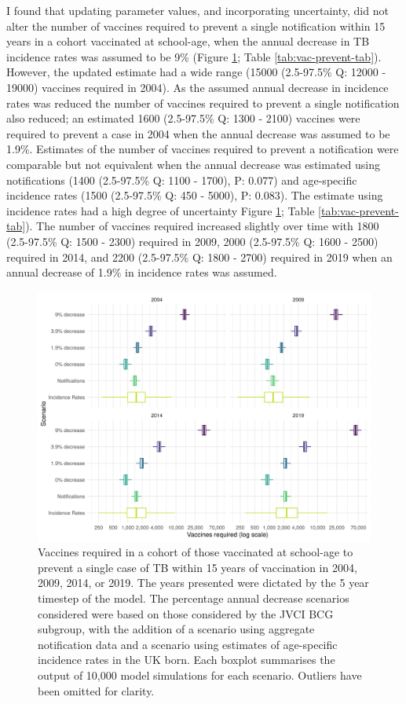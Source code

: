 \documentclass[11pt,twoside]{bristolthesis}
\begin{document}
  I found that updating parameter values, and incorporating uncertainty, did not alter the number of vaccines required to prevent a single notification within 15 years in a cohort vaccinated at school-age, when the annual decrease in TB incidence rates was assumed to be 9\% (Figure \ref{fig:graph-vacs-to-prev}; Table \ref{tab:vac-prevent-tab}). However, the updated estimate had a wide range (15000 (2.5-97.5\% Q: 12000 - 19000) vaccines required in 2004). As the assumed annual decrease in incidence rates was reduced the number of vaccines required to prevent a single notification also reduced; an estimated 1600 (2.5-97.5\% Q: 1300 - 2100) vaccines were required to prevent a case in 2004 when the annual decrease was assumed to be 1.9\%. Estimates of the number of vaccines required to prevent a notification were comparable but not equivalent when the annual decrease was estimated using notifications (1400 (2.5-97.5\% Q: 1100 - 1700), P: 0.077) and age-specific incidence rates (1500 (2.5-97.5\% Q: 450 - 5000), P: 0.083). The estimate using incidence rates had a high degree of uncertainty Figure \ref{fig:graph-vacs-to-prev}; Table \ref{tab:vac-prevent-tab}). The number of vaccines required increased slightly over time with 1800 (2.5-97.5\% Q: 1500 - 2300) required in 2009, 2000 (2.5-97.5\% Q: 1600 - 2500) required in 2014, and 2200 (2.5-97.5\% Q: 1800 - 2700) required in 2019 when an annual decrease of 1.9\% in incidence rates was assumed.
  \begin{figure}
  
  {\centering \includegraphics[width=0.8\linewidth,]{chapters/evidence-policy-change/graph-vacs-to-prev-1} 
  
  }
  
  \caption[Vaccines required in a cohort of those vaccinated at school-age to prevent a single case of TB within 15 years of vaccination in 2004, 2009, 2014, or 2019.]{Vaccines required in a cohort of those vaccinated at school-age to prevent a single case of TB within 15 years of vaccination in 2004, 2009, 2014, or 2019. The years presented were dictated by the 5 year timestep of the model. The percentage annual decrease scenarios considered were based on those considered by the JVCI BCG subgroup, with the addition of a scenario using aggregate notification data and a scenario using estimates of age-specific incidence rates in the UK born. Each boxplot summarises the output of 10,000 model simulations for each scenario. Outliers have been omitted for clarity.}\label{fig:graph-vacs-to-prev}
  \end{figure}
\end{document}
